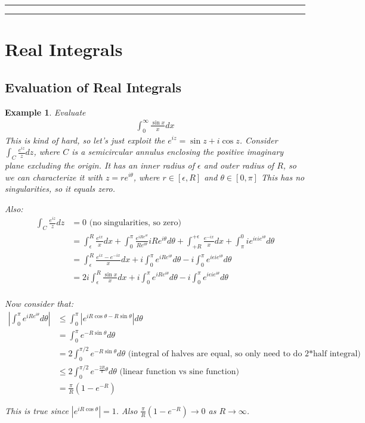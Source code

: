 \documentclass{article}
\newtheorem{ex}{Example}
\theoremstyle{definition}
\newcommand{\Section}[1]{\hrule\hrule\section{#1}}
\begin{document}
\Section{Real Integrals}
\subsection{Evaluation of Real Integrals}
\begin{ex}
Evaluate 
\begin{align*}
\int_0^\infty \frac{\sin x}{x} dx 
\end{align*}
This is kind of hard, so let's just exploit the $e^{iz} = \sin z + i \cos z$. 
Consider $\int_C \frac{e^{iz}}{z} dz$, where $C$ is a semicircular annulus enclosing the positive imaginary plane excluding the origin. It has an inner radius of $\epsilon$ and outer radius of $R$, so we can characterize it with $z=re^{i\theta}$, where $r \in [\epsilon, R]$ and $\theta \in [0, \pi]$ This has no singularities, so it equals zero. 

Also:
\begin{align*}
\int_C \frac{e^{iz}}{z} dz & = 0 \text{ (no singularities, so zero)}\\ 
&= \int_{\epsilon}^R \frac{e^{ix}}{x}dx + \int_0^\pi \frac{e^{iRe^{i\theta}}}{Re^{i\theta}} iRe^{i\theta} d\theta + \int_{+R}^{+\epsilon}\frac{e^{-ix}}{x}dx + \int_{\pi}^{0} ie^{i\epsilon i e^{i\theta}} d\theta \\ 
&= \int_{\epsilon}^{R} \frac{e^{ix}-e^{-ix}}{x}dx + i \int_{0}^{\pi} e^{iRe^{i\theta}} d\theta - i \int_{0}^{\pi}e^{i\epsilon i e^{i\theta}} d\theta \\ 
&= 2 i \int_{\epsilon}^{R} \frac{\sin x}{x}dx + i \int_{0}^{\pi} e^{iRe^{i\theta}} d\theta - i \int_{0}^{\pi}e^{i\epsilon i e^{i\theta}} d\theta \\ 
\end{align*}

Now consider that:
\begin{align*}
\left|\int_{0}^\pi e^{iRe^{i\theta}} d\theta \right| &\leq \int_{0}^\pi \left|e^{iR \cos \theta - R \sin \theta } \right|d\theta \\ 
& = \int_{0}^\pi e^{-R\sin\theta} d\theta  \\ 
& = 2 \int_{0}^{\pi/2} e^{-R\sin\theta} d\theta \text{ (integral of halves are equal, so only need to do 2*half integral)}\\ 
& \leq  2 \int_{0}^{\pi/2} e^{-\frac{2R}{\pi}\theta} d\theta \text{ (linear function vs sine function)} \\ 
& = \frac{\pi }{R}(1-e^{-R}) 
\end{align*}

This is true since $|e^{iR \cos \theta}| = 1$. Also $\frac{\pi }{R}(1-e^{-R}) \to 0$ as $R \to \infty$.


\end{ex}
\end{document}
